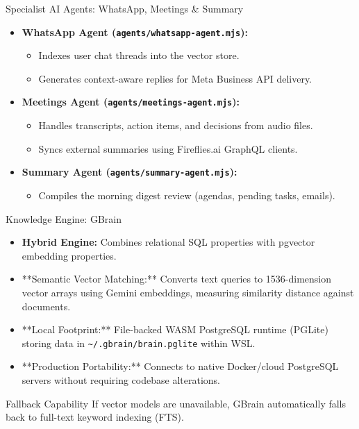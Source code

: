 \documentclass[10pt]{beamer}
\begin{document}
\begin{frame}{Specialist AI Agents: WhatsApp, Meetings \& Summary}
  \begin{itemize}
    \item \textbf{WhatsApp Agent (\texttt{agents/whatsapp-agent.mjs}):}
      \begin{itemize}
        \item Indexes user chat threads into the vector store.
        \item Generates context-aware replies for Meta Business API delivery.
      \end{itemize}
    \vspace{0.3cm}
    \item \textbf{Meetings Agent (\texttt{agents/meetings-agent.mjs}):}
      \begin{itemize}
        \item Handles transcripts, action items, and decisions from audio files.
        \item Syncs external summaries using Fireflies.ai GraphQL clients.
      \end{itemize}
    \vspace{0.3cm}
    \item \textbf{Summary Agent (\texttt{agents/summary-agent.mjs}):}
      \begin{itemize}
        \item Compiles the morning digest review (agendas, pending tasks, emails).
      \end{itemize}
  \end{itemize}
\end{frame}

\begin{frame}{Knowledge Engine: GBrain}
  \begin{itemize}
    \item \textbf{Hybrid Engine:} Combines relational SQL properties with pgvector embedding properties.
    \item **Semantic Vector Matching:** Converts text queries to 1536-dimension vector arrays using Gemini embeddings, measuring similarity distance against documents.
    \item **Local Footprint:** File-backed WASM PostgreSQL runtime (PGLite) storing data in \texttt{\textasciitilde{}/.gbrain/brain.pglite} within WSL.
    \item **Production Portability:** Connects to native Docker/cloud PostgreSQL servers without requiring codebase alterations.
  \end{itemize}
  \vfill
  \begin{block}{Fallback Capability}
    If vector models are unavailable, GBrain automatically falls back to full-text keyword indexing (FTS).
  \end{block}
\end{frame}
\end{document}
